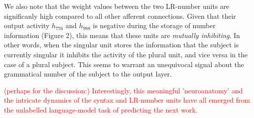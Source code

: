 We also note that the weight values between the two LR-number units are significanly high compared to all other afferent connections. Given that their output activity $h_776$ and $h_988$ is negative during the storage of number information (Figure 2), this means that these units are \textit{mutually inhibiting}. In other words, when the singular unit stores the information that the subject is currently singular it inhibits the activity of the plural unit, and vice versa in the case of a plural subject. This seems to warrant an unequivocal signal about the grammatical number of the subject to the output layer.

\textcolor{red}{(perhaps for the discussion:) Interestingly, this meaningful 'neuroanatomy' and the intricate dynamics of the syntax and LR-number units have all emerged from the unlabelled language-model task of predicting the next work.}


